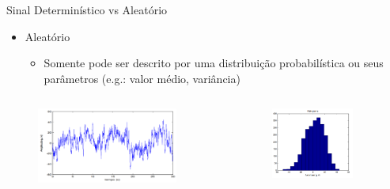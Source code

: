 \documentclass[aspectratio=169,
				xcolor=table]{beamer}
\begin{document}
	\begin{frame}{Sinal Determinístico vs Aleatório}
		\begin{itemize}
			\item Aleatório
			\begin{itemize}
				\item Somente pode ser descrito por uma distribuição probabilística ou seus parâmetros (e.g.: valor médio, variância)
			\end{itemize}
		\end{itemize}
		
		\begin{columns}
			\begin{column}{0.5\textwidth}
				\begin{figure}[hbtp]
					\centering
					\includegraphics[width=0.9\textwidth, keepaspectratio]{../figs/cap01/aleatorio01.png}
				\end{figure}
			\end{column}
			\begin{column}{0.5\textwidth}
				\begin{figure}[hbtp]
					\centering
					\includegraphics[width=0.8\textwidth, keepaspectratio]{../figs/cap01/aleatorio02.png}
				\end{figure}
				
			\end{column}
		\end{columns}
	\end{frame}
	
\end{document}
